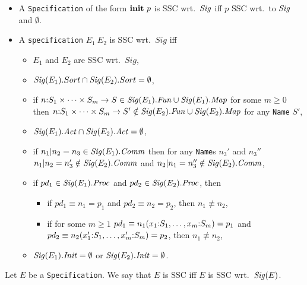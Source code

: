 \documentclass[twoside,fleqn,a4paper,dvips]{article}
\newcommand{\Sig}{\nm{Sig}}
\newcommand{\Fun}{\nm{Fun}}
\begin{document}
\begin{defn}[\tt Specification]
\begin{itemize}
\begin{itemize}
\end{itemize}
\item
A {\tt Specification} of the form $\mathbf{init}~p$ is SSC wrt.\ $\Sig$ 
iff $p$ SSC wrt.\ to $\Sig$ and $\emptyset$.
\item
A {\tt specification} $E_1~E_2$ is SSC wrt.\ $Sig$ iff 
\begin{itemize}
\item
$E_1$ and $E_2$ are SSC wrt.\ $Sig$,
\item
$\Sig(E_1).Sort \cap \Sig(E_2).Sort=\emptyset$,
\item
if $n\ap S_1\times \cdots\times S_m\rightarrow S \in \Sig(E_1).\Fun\cup
\Sig(E_1).\Map$ for some
$m\geq 0$ then
$n\ap S_1\times\cdots\times S_m\rightarrow S'\notin \Sig(E_2).\Fun\cup
\Sig(E_2).\Map$ for any {\tt Name} $S'$,
\item
$\Sig(E_1).\Act \cap \Sig(E_2).\Act=\emptyset$,
\item
if $n_1| n_2=n_3\in \Sig(E_1).\Comm$ then for any {\tt Name}s $n_3'$
and $n_3''$ $n_1| n_2=n_3'\notin
\Sig(E_2).\Comm$ and $n_2| n_1=n_3''\notin \Sig(E_2).\Comm$, 
\item
if $pd_1\in \Sig(E_1).\Proc$ and $pd_2\in \Sig(E_2).\Proc$, then
\begin{itemize}
\item
if $pd_1\equiv n_1=p_1$ and $pd_2\equiv n_2=p_2$, then $n_1\not\equiv
n_2$,
\item
if for some $m\geq 1$ $pd_1\equiv n_1(x_1{:} S_1,\ldots,x_m{:} S_m)=p_1$
and 
$pd_2\equiv n_2(x_1'{:} S_1,\ldots,x_m'{:} S_m)=p_2$, then $n_1\not\equiv
n_2$,
\end{itemize}
\item
$\Sig(E_1).\Init=\emptyset$ or $\Sig(E_2).\Init=\emptyset$.
\end{itemize}
\end{itemize}
\end{defn}
\begin{defn}\label{def:SSC-mCRL}
Let $E$ be a {\tt Specification}. We say that $E$ is SSC iff $E$ is SSC
wrt.\ $\Sig(E)$.
\end{defn}
\end{document}
